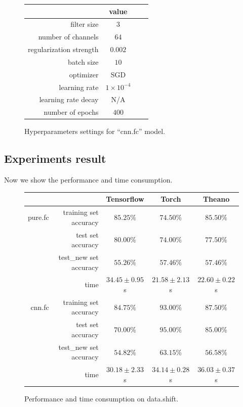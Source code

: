 \documentclass[a4paper]{article}
\begin{document}
\begin{figure}[H]
\centering
\begin{tabular}{|r|c|c|c|}
\hline
 & value \\
\hline
filter size & $3$ \\
\hline
number of channels & $64$ \\
\hline
regularization strength & $0.002$ \\
\hline
batch size & $10$ \\
\hline
optimizer & SGD \\
\hline
learning rate & $1\times10^{-4}$\\
\hline
learning rate decay & N/A \\
\hline
number of epochs & $400$ \\
\hline
\end{tabular}
\caption{Hyperparameters settings for ``cnn.fc'' model.}
\end{figure}

\subsection{Experiments result}

Now we show the performance and time consumption.

\begin{figure}[H]
\centering
\begin{tabular}{|r|r|c|c|c|}
\hline
 & & Tensorflow & Torch & Theano \\
\hline
pure.fc & training set accuracy & $85.25\%$ & $74.50\%$ & $\bm{85.50}\%$ \\
 & test set accuracy & $\bm{80.00}\%$ & $74.00\%$ & $77.50\%$ \\
 & test\_new set accuracy & $55.26\%$ & $\bm{57.46}\%$ & $\bm{57.46}\%$ \\
 & time & $34.45\pm0.95$s & $\bm{21.58\pm2.13}$s & $22.60\pm0.22$s \\
\hline
cnn.fc & training set accuracy & $84.75\%$ & $\bm{93.00}\%$ & $87.50\%$ \\
 & test set accuracy & $70.00\%$ & $\bm{95.00}\%$ & $85.00\%$ \\
 & test\_new set accuracy & $54.82\%$ & $\bm{63.15}\%$ & $56.58\%$ \\
 & time & $\bm{30.18\pm2.33}$s & $34.14\pm0.28$s & $36.03\pm0.37$s \\
\hline
\end{tabular}
\caption{Performance and time consumption on data.shift.}
\end{figure}
\end{document}
